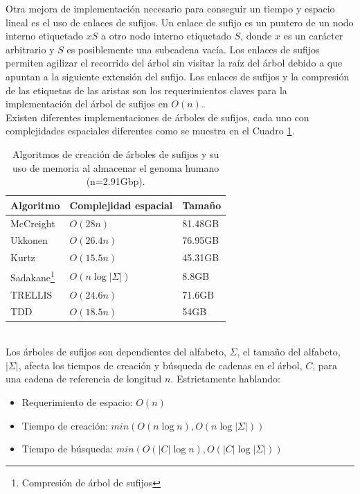 \documentclass[12pt,a4paper]{article}
\begin{document}
\indent
Otra mejora de implementación necesario para conseguir un tiempo y espacio 
lineal es el uso de enlaces de sufijos. Un enlace de sufijo es un puntero de un 
nodo interno etiquetado $xS$ a otro nodo interno etiquetado $S$, donde $x$ es un 
carácter arbitrario y $S$ es posiblemente una subcadena vacía. Los enlaces de 
sufijos permiten agilizar el recorrido del árbol sin visitar la raíz del árbol 
debido a que apuntan a la siguiente extensión del sufijo. Los enlaces de sufijos 
y la compresión de las etiquetas de las aristas son los requerimientos claves 
para la implementación del árbol de sufijos en $O(n)$.\\
\indent
Existen diferentes implementaciones de árboles de sufijos, cada uno con 
complejidades espaciales diferentes como se muestra en el Cuadro \ref{tab:stmem}.\\
\begin{table}[h!]  
\begin{small}
\begin{center}
\begin{tabular}{lll}
Algoritmo & Complejidad espacial & Tamaño \\
\hline
McCreight & $O(28n)$ & 81.48GB \\
\hline
Ukkonen & $O(26.4n)$ & 76.95GB \\
\hline
Kurtz & $O(15.5n)$ & 45.31GB \\
\hline
Sadakane\footnote{Compresión de árbol de sufijos} & $O(n\log|\Sigma|)$ & 8.8GB \\
\hline
TRELLIS \cite{Phoophakdee2007} & $O(24.6n)$ & 71.6GB \\
\hline
TDD \cite{Barsky2010} & $O(18.5n)$ & 54GB \\
\end{tabular}
\end{center}
\end{small}
\caption{Algoritmos de creación de árboles de sufijos y su uso de memoria al
almacenar el genoma humano (n=2.91Gbp).}
\label{tab:stmem}
\end{table}
\\ \indent
Los árboles de sufijos son dependientes del alfabeto, $\Sigma$, el tamaño 
del alfabeto, $|\Sigma|$, afecta los tiempos de creación y búsqueda de 
cadenas en el árbol, $C$, para una cadena de referencia de longitud $n$. 
Estrictamente hablando:
    \begin{itemize} 
      \item Requerimiento de espacio: $O(n)$ 
      \item Tiempo de creación: $min (O(n\log n), O(n\log |\Sigma|))$ 
      \item Tiempo de búsqueda: $min (O(|C|\log n), O(|C|\log |\Sigma|))$ 
    \end{itemize}
\indent
\end{document}
